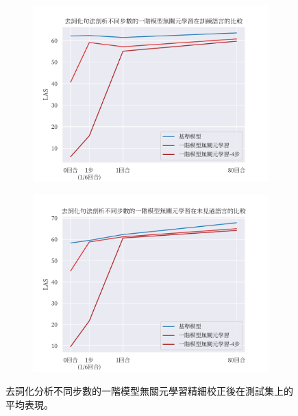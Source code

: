 \begin{figure}[htbp]
    \centering
    \begin{subfigure}[t]{\textwidth}
        \centering
        \includegraphics[width=\textwidth]{figs/chapter3/delex/delex_fomaml_train_langs.pdf}
    \end{subfigure}
    \vspace{-12pt}
    \begin{subfigure}[t]{\textwidth}
        \centering
        \includegraphics[width=\textwidth]{figs/chapter3/delex/delex_fomaml_test_langs.pdf}
    \end{subfigure}
    \caption{去詞化分析不同步數的一階模型無關元學習精細校正後在測試集上的平均表現。}
    \label{fig:delex_avg}
\end{figure}
